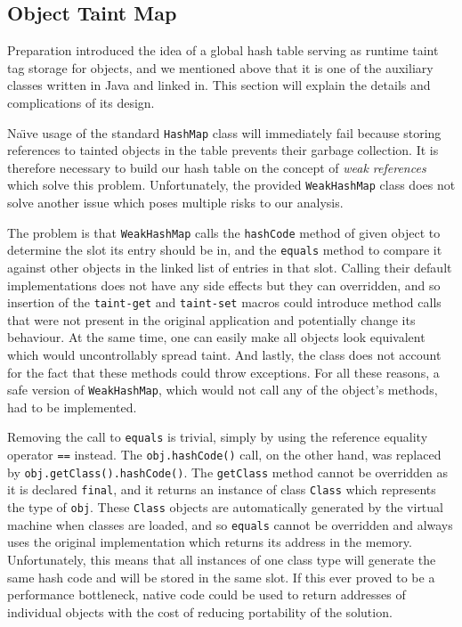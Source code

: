 \documentclass[12pt,twoside,notitlepage]{report}
\begin{document}
\subsection{Object Taint Map}

Preparation introduced the idea of a global hash table serving as runtime taint tag storage for objects, and we mentioned above that it is one of the auxiliary classes written in Java and linked in. This section will explain the details and complications of its design.

Na\"{\i}ve usage of the standard \verb$HashMap$ class will immediately fail because storing references to tainted objects in the table prevents their garbage collection. It is therefore necessary to build our hash table on the concept of \emph{weak references} which solve this problem. Unfortunately, the provided \verb$WeakHashMap$ class does not solve another issue which poses multiple risks to our analysis.

The problem is that \verb$WeakHashMap$ calls the \verb$hashCode$ method of given object to determine the slot its entry should be in, and the \verb$equals$ method to compare it against other objects in the linked list of entries in that slot. Calling their default implementations does not have any side effects but they can overridden, and so insertion of the \verb$taint-get$ and \verb$taint-set$ macros could introduce method calls that were not present in the original application and potentially change its behaviour. At the same time, one can easily make all objects look equivalent which would uncontrollably spread taint. And lastly, the class does not account for the fact that these methods could throw exceptions. For all these reasons, a safe version of \verb$WeakHashMap$, which would not call any of the object's methods, had to be implemented. 

Removing the call to \verb$equals$ is trivial, simply by using the reference equality operator \verb$==$ instead. The \verb$obj.hashCode()$ call, on the other hand, was replaced by \verb$obj.getClass().hashCode()$. The \verb$getClass$ method cannot be overridden as it is declared \verb$final$, and it returns an instance of class \verb$Class$ which represents the type of \verb$obj$. These \verb$Class$ objects are automatically generated by the virtual machine when classes are loaded, and so \verb$equals$ cannot be overridden and always uses the original implementation which returns its address in the memory. Unfortunately, this means that all instances of one class type will generate the same hash code and will be stored in the same slot. If this ever proved to be a performance bottleneck, native code could be used to return addresses of individual objects with the cost of reducing portability of the solution. 
\end{document}
